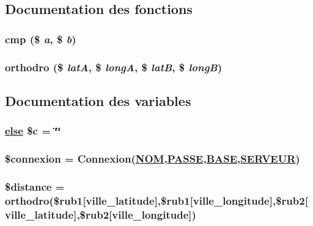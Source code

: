 \subsection{Documentation des fonctions}
\hypertarget{distance_8php_a9}{
\subsubsection[cmp]{\setlength{\rightskip}{0pt plus 5cm}cmp (\$ {\em a}, \$ {\em b})}}
\label{distance_8php_a9}


\hypertarget{distance_8php_a8}{
\subsubsection[orthodro]{\setlength{\rightskip}{0pt plus 5cm}orthodro (\$ {\em lat\-A}, \$ {\em long\-A}, \$ {\em lat\-B}, \$ {\em long\-B})}}
\label{distance_8php_a8}




\subsection{Documentation des variables}
\hypertarget{distance_8php_a7}{
\subsubsection[\$c]{\setlength{\rightskip}{0pt plus 5cm}\hyperlink{cron_8php_a9}{else} \$c = \char`\"{}\char`\"{}}}
\label{distance_8php_a7}


\hypertarget{distance_8php_a0}{
\subsubsection[\$connexion]{\setlength{\rightskip}{0pt plus 5cm}\$connexion = Connexion(\hyperlink{pma__connect_8php_a0}{NOM},\hyperlink{pma__connect_8php_a1}{PASSE},\hyperlink{pma__connect_8php_a3}{BASE},\hyperlink{pma__connect_8php_a2}{SERVEUR})}}
\label{distance_8php_a0}


\hypertarget{distance_8php_a4}{
\subsubsection[\$distance]{\setlength{\rightskip}{0pt plus 5cm}\$distance = orthodro(\$rub1\mbox{[}ville\_\-latitude\mbox{]},\$rub1\mbox{[}ville\_\-longitude\mbox{]},\$rub2\mbox{[}ville\_\-latitude\mbox{]},\$rub2\mbox{[}ville\_\-longitude\mbox{]})}}
\label{distance_8php_a4}


